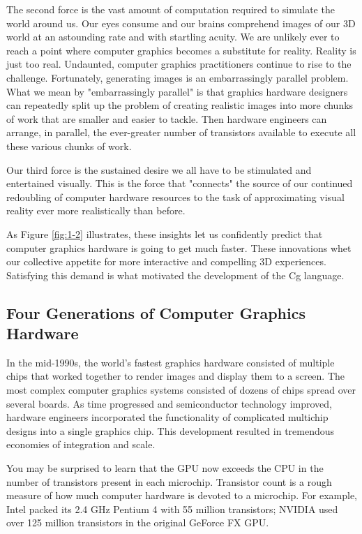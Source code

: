 \documentclass[../main.tex]{subfiles}
\begin{document}
The second force is the vast amount of computation required to simulate the world around us. Our eyes consume and our brains comprehend images of our 3D world at an astounding rate and with startling acuity. We are unlikely ever to reach a point where computer graphics becomes a substitute for reality. Reality is just too real. Undaunted, computer graphics practitioners continue to rise to the challenge. Fortunately, generating images is an embarrassingly parallel problem. What we mean by "embarrassingly parallel" is that graphics hardware designers can repeatedly split up the problem of creating realistic images into more chunks of work that are smaller and easier to tackle. Then hardware engineers can arrange, in parallel, the ever-greater number of transistors available to execute all these various chunks of work.

Our third force is the sustained desire we all have to be stimulated and entertained visually. This is the force that "connects" the source of our continued redoubling of computer hardware resources to the task of approximating visual reality ever more realistically than before.

As Figure \ref{fig:1-2} illustrates, these insights let us confidently predict that computer graphics hardware is going to get much faster. These innovations whet our collective appetite for more interactive and compelling 3D experiences. Satisfying this demand is what motivated the development of the Cg language.

\subsection{Four Generations of Computer Graphics Hardware}

In the mid-1990s, the world's fastest graphics hardware consisted of multiple chips that worked together to render images and display them to a screen. The most complex computer graphics systems consisted of dozens of chips spread over several boards. As time progressed and semiconductor technology improved, hardware engineers incorporated the functionality of complicated multichip designs into a single graphics chip. This development resulted in tremendous economies of integration and scale.

You may be surprised to learn that the GPU now exceeds the CPU in the number of transistors present in each microchip. Transistor count is a rough measure of how much computer hardware is devoted to a microchip. For example, Intel packed its 2.4 GHz Pentium 4 with 55 million transistors; NVIDIA used over 125 million transistors in the original GeForce FX GPU.
\end{document}
